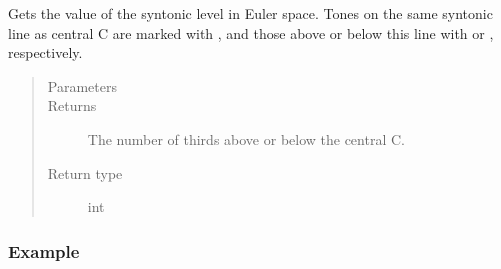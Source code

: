 \documentclass[letterpaper,10pt,english]{sphinxmanual}
\begin{document}
\begin{fulllineitems}

\begin{fulllineitems}
\label{\detokenize{api:main.Tone.get_syntonic}}
Gets the value of the syntonic level in Euler space.
Tones on the same syntonic line as central C are marked with \sphinxtitleref{\_},
and those above or below this line with  or \sphinxtitleref{,}, respectively.
\begin{quote}\begin{description}
\item[{Parameters}] \leavevmode
{} \textendash{} 

\item[{Returns}] \leavevmode
The number of thirds above or below the central C.

\item[{Return type}] \leavevmode
int

\end{description}\end{quote}
\subsubsection*{Example}

\begin{sphinxVerbatim}[commandchars=\\\{\}]
   
   
   
  
\end{sphinxVerbatim}

\end{fulllineitems}


\end{fulllineitems}
\end{document}
